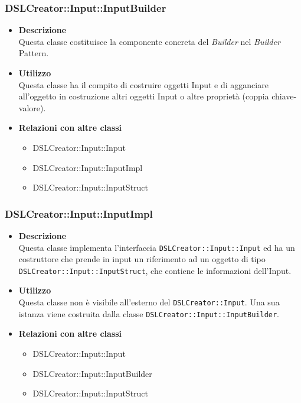  \subsubsection{DSLCreator::Input::InputBuilder}
                    \begin{itemize}
                        \item \textbf{Descrizione} \hfill \\
                          Questa classe costituisce la componente concreta del \textit{Builder} nel \textit{Builder} Pattern.
                        \item \textbf{Utilizzo} \hfill \\
                          Questa classe ha il compito di costruire oggetti Input e di agganciare all'oggetto in costruzione altri oggetti Input o altre proprietà (coppia chiave-valore).
                        \item \textbf{Relazioni con altre classi}
                            \begin{itemize}
                              \item DSLCreator::Input::Input
                              \item DSLCreator::Input::InputImpl
                              \item DSLCreator::Input::InputStruct
                            \end{itemize}
                    \end{itemize}  

 \subsubsection{DSLCreator::Input::InputImpl}
                    \begin{itemize}
                        \item \textbf{Descrizione} \hfill \\
                          Questa classe implementa l'interfaccia \texttt{DSLCreator::Input::Input} ed ha un costruttore che prende in input un riferimento ad un oggetto di tipo \texttt{DSLCrea\-tor::Input::InputStruct}, che contiene le informazioni dell'Input.
                        \item \textbf{Utilizzo} \hfill \\
                          Questa classe non è visibile all'esterno del  \texttt{DSLCreator::Input}. Una sua istanza viene costruita dalla classe \texttt{DSLCreator::Input::InputBuilder}.
                        \item \textbf{Relazioni con altre classi}
                            \begin{itemize}
                              \item DSLCreator::Input::Input
                              \item DSLCreator::Input::InputBuilder
                              \item DSLCreator::Input::InputStruct
                            \end{itemize}
                    \end{itemize}  

